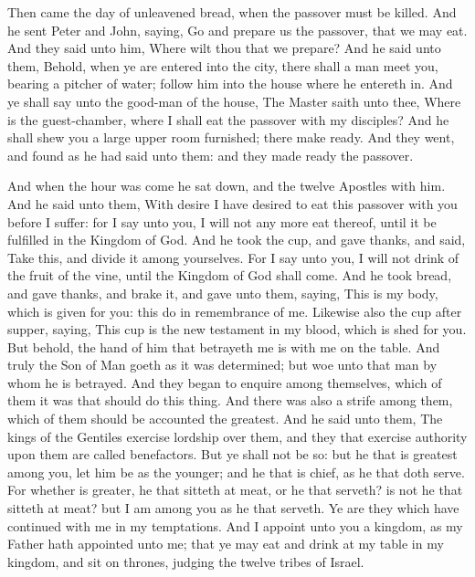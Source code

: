 Then came the day of unleavened bread, when the passover must be killed. And he sent Peter and John, saying, Go and prepare us the passover, that we may eat. And they said unto him, Where wilt thou that we prepare? And he said unto them, Behold, when ye are entered into the city, there shall a man meet you, bearing a pitcher of water; follow him into the house where he entereth in. And ye shall say unto the good-man of the house, The Master saith unto thee, Where is the guest-chamber, where I shall eat the passover with my disciples? And he shall shew you a large upper room furnished; there make ready. And they went, and found as he had said unto them: and they made ready the passover.

And when the hour was come he sat down, and the twelve Apostles with him. And he said unto them, With desire I have desired to eat this passover with you before I suffer: for I say unto you, I will not any more eat thereof, until it be fulfilled in the Kingdom of God. And he took the cup, and gave thanks, and said, Take this, and divide it among yourselves. For I say unto you, I will not drink of the fruit of the vine, until the Kingdom of God shall come. And he took bread, and gave thanks, and brake it, and gave unto them, saying, This is my body, which is given for you: this do in remembrance of me. Likewise also the cup after supper, saying, This cup is the new testament in my blood, which is shed for you. But behold, the hand of him that betrayeth me is with me on the table. And truly the Son of Man goeth as it was determined; but woe unto that man by whom he is betrayed. And they began to enquire among themselves, which of them it was that should do this thing. And there was also a strife among them, which of them should be accounted the greatest. And he said unto them, The kings of the Gentiles exercise lordship over them, and they that exercise authority upon them are called benefactors. But ye shall not be so: but he that is greatest among you, let him be as the younger; and he that is chief, as he that doth serve. For whether is greater, he that sitteth at meat, or he that serveth? is not he that sitteth at meat? but I am among you as he that serveth. Ye are they which have continued with me in my temptations. And I appoint unto you a kingdom, as my Father hath appointed unto me; that ye may eat and drink at my table in my kingdom, and sit on thrones, judging the twelve tribes of Israel.

